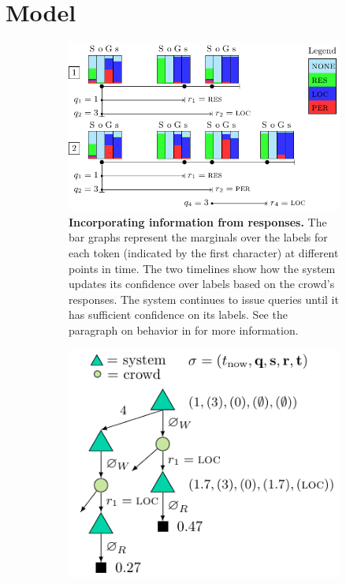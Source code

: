 \section{Model}
\label{sec:model}

\begin{figure}
  \begin{centering}
    \begin{subfigure}[b]{0.58\textwidth}
      \includegraphics[width=\textwidth]{figures/behavior.pdf}
      \caption{
      {\bf Incorporating information from responses.}
      The bar graphs represent the marginals over the labels for each token (indicated by the first character) at different points in time. 
      The two timelines show how the system updates its confidence over labels based on the crowd's responses.
      The system continues to issue queries until it has sufficient confidence on its labels. 
      See the paragraph on behavior in  for more information.
      }
\label{fig:behavior}
    \end{subfigure}
    \hfill
    \begin{subfigure}[b]{0.38\textwidth}
      \includegraphics[width=\textwidth,height=0.23\textheight,keepaspectratio]{figures/mcts_simple.pdf}\\[1.7ex]

\end{subfigure}
\end{centering}
\end{figure}
